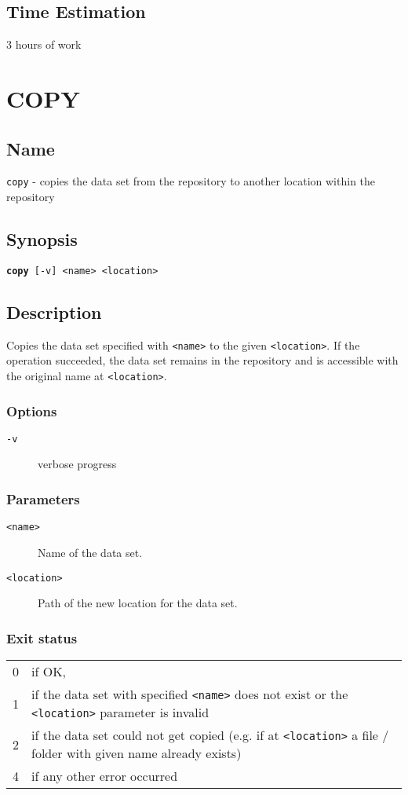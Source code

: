 \documentclass{article} %
\begin{document}
				\subsection*{Time Estimation}
				3 hours of work \\
				\noindent
		\newpage
		\section*{COPY}
		\subsection*{Name}
		\texttt{copy} - copies the data set from the repository to another location within the repository
		\subsection*{Synopsis}
		\texttt{\textbf{copy} [-v] <name> <location>}
		\subsection*{Description}
		Copies the data set specified with \texttt{<name>} to the given \texttt{<location>}.
		If the operation succeeded, the data set remains in the repository and is accessible with the original name at  \texttt{<location>}.\\
		
		\noindent
		\subsubsection*{Options}
		\begin{description}
			\item[\texttt{-v}] verbose progress
		\end{description}
		
		\subsubsection*{Parameters}
		\begin{description}
			\item[\texttt{<name>}]  Name of the data set.
			\item[\texttt{<location>}] Path of the new location for the data set.
		\end{description}
		\subsubsection*{Exit status}
		\begin{tabular}{ll}
			0 &  if OK,\\ 
			1 &  if the data set with specified \texttt{<name>} does not exist or the \texttt{<location>} parameter is invalid\\
			2 &  if the data set could not get copied (e.g. if at \texttt{<location>} a file / folder with given name already exists)\\
			4 &  if any other error occurred\\
		\end{tabular}
		
\end{document}
